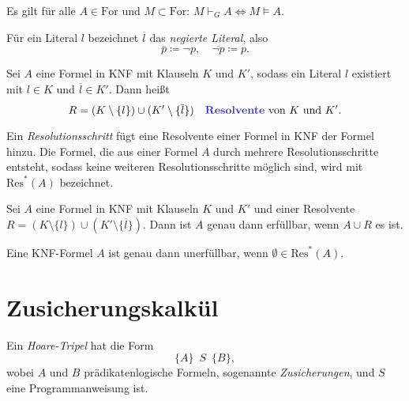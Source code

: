 \documentclass{cheat-sheet}
\newcommand{\For}{\mathrm{For}} %
\newcommand{\Res}{\mathrm{Res}} %
\newcommand{\HoareT}[3]{\{ #1 \} \enspace #2 \enspace \{ #3 \}} %
\begin{document}
\begin{satz}
  Es gilt für alle $A \in \For$ und $M \subset \For$: $M \vdash_G A \iff M \models A$.
\end{satz}


\begin{nota}
  Für ein Literal $l$ bezeichnet $\overline{l}$ das \emph{negierte Literal}, also
  \[ \overline{p} \coloneqq \neg p, \quad \overline{\neg p} \coloneqq p. \]
\end{nota}

\begin{defn}
  Sei $A$ eine Formel in KNF mit Klauseln $K$ und $K'$, sodass ein Literal $l$ existiert mit $l \in K$ und $\overline{l} \in K'$. Dann heißt
  \[
    R = (K \setminus \{ l \}) \cup (K' \setminus \{ \overline{l} \})
    \quad \text{\emph{Resolvente} von $K$ und $K'$.}
  \]
\end{defn}

\begin{defn}
  Ein \emph{Resolutionsschritt} fügt eine Resolvente einer Formel in KNF der Formel hinzu. Die Formel, die aus einer Formel $A$ durch mehrere Resolutionsschritte entsteht, sodass keine weiteren Resolutionsschritte möglich sind, wird mit $\Res^*(A)$ bezeichnet.
\end{defn}

\begin{lem}
  Sei $A$ eine Formel in KNF mit Klauseln $K$ und $K'$ und einer Resolvente $R = (K \setminus \{ l \}) \cup (K' \setminus \{ \overline{l} \})$. Dann ist $A$ genau dann erfüllbar, wenn $A \cup R$ es ist.
\end{lem}

\begin{satz}[Resolutionssatz]
  Eine KNF-Formel $A$ ist genau dann unerfüllbar, wenn $\emptyset \in \Res^*(A)$.
\end{satz}

\section{Zusicherungskalkül}

\begin{defn}
  Ein \emph{Hoare-Tripel} hat die Form
  \[ \HoareT{A}{S}{B}, \]
  wobei $A$ und $B$ prädikatenlogische Formeln, sogenannte \emph{Zusicherungen}, und $S$ eine Programmanweisung ist.
\end{defn}
\end{document}
